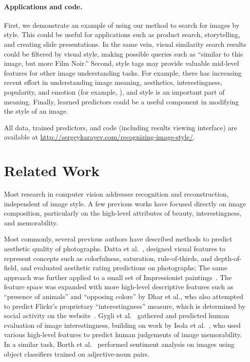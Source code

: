 \paragraph{Applications and code.}
First, we demonstrate an example of using our method to search for images by style.
This could be useful for applications such as product search, storytelling, and creating slide presentations.
In the same vein, visual similarity search results could be filtered by visual style, making possible queries such as ``similar to this image, but more Film Noir.''
Second, style tags may provide valuable mid-level features for other image understanding tasks.
For example, there has increasing recent effort in understanding image meaning, aesthetics, interestingness, popularity, and emotion (for example, \parencite{Gygli-ICCV-2013,Isola-CVPR-2011,joo2014,khosla2014}), and style is an important part of meaning.
Finally, learned predictors could be a useful component in modifying the style of an image.

All data, trained predictors, and code (including results viewing interface) are available at \url{http://sergeykarayev.com/recognizing-image-style/}.

\section{Related Work}

Most research in computer vision addresses recognition and reconstruction, independent of image style.
A few previous works have focused directly on image composition, particularly on the high-level attributes of beauty, interestingness, and memorability.

Most commonly, several previous authors have described methods to predict aesthetic quality of photographs.
Datta et al.~\parencite{Datta-ECCV-2006}, designed visual features to represent concepts such as colorfulness, saturation, rule-of-thirds, and depth-of-field, and evaluated aesthetic rating predictions on photographs; The same approach was further applied to a small set of Impressionist paintings~\parencite{Li-SP-2009}.
The feature space was expanded with more high-level descriptive features such as ``presence of animals'' and ``opposing colors'' by Dhar et al., who also attempted to predict Flickr's proprietary ``interestingness'' measure, which is determined by social activity on the website~\parencite{Dhar-CVPR-2011}.
Gygli et al.~\parencite{Gygli-ICCV-2013} gathered and predicted human evaluation of image interestingness, building on work by Isola et al.~\parencite{Isola-CVPR-2011}, who used various high-level features to predict human judgements of image memorability.
In a similar task, Borth et al.~\parencite{Borth-MM-2013} performed sentiment analysis on images using object classifiers trained on adjective-noun pairs.

